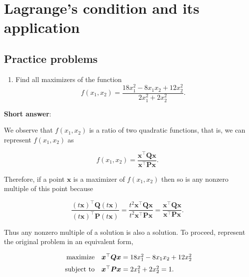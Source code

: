 \section{Lagrange's condition and its application}

\subsection{Practice problems}
\begin{enumerate}
	\item Find all maximizers of the function
	\[
	f\left(x_{1}, x_{2}\right)=\frac{18 x_{1}^{2}-8 x_{1} x_{2}+12 x_{2}^{2}}{2 x_{1}^{2}+2 x_{2}^{2}} .
	\]
\end{enumerate}


\textbf{Short answer}:

We observe that \(f\left(x_{1}, x_{2}\right)\) is a ratio of two quadratic functions, that is, we can represent \(f\left(x_{1}, x_{2}\right)\) as

\[
	f\left(x_{1}, x_{2}\right)=\frac{\boldsymbol{x}^{\top} \boldsymbol{Q} \boldsymbol{x}}{\boldsymbol{x}^{\top} \boldsymbol{P} \boldsymbol{x}} .
\]

Therefore, if a point \(\boldsymbol{x}\) is a maximizer of \(f\left(x_{1}, x_{2}\right)\) then so is any nonzero multiple of this point because

\begin{equation*}
	\frac{(t \boldsymbol{x})^{\top} \boldsymbol{Q}(t \boldsymbol{x})}{(t \boldsymbol{x})^{\top} \boldsymbol{P}(t \boldsymbol{x})}=\frac{t^{2} \boldsymbol{x}^{\top} \boldsymbol{Q} \boldsymbol{x}}{t^{2} \boldsymbol{x}^{\top} \boldsymbol{P} \boldsymbol{x}}=\frac{\boldsymbol{x}^{\top} \boldsymbol{Q} \boldsymbol{x}}{\boldsymbol{x}^{\top} \boldsymbol{P} \boldsymbol{x}} .
\end{equation*}

Thus any nonzero multiple of a solution is also a solution. To proceed, represent the original problem in an equivalent form,

\[
	\begin{array}{rl}
		\operatorname{maximize} & \boldsymbol{x}^{\top} \boldsymbol{Q} \boldsymbol{x}=18 x_{1}^{2}-8 x_{1} x_{2}+12 x_{2}^{2} \vspace{2mm}\\
		\text { subject to} & \boldsymbol{x}^{\top} \boldsymbol{P} \boldsymbol{x}=2 x_{1}^{2}+2 x_{2}^{2}=1 .
	\end{array}
\]

